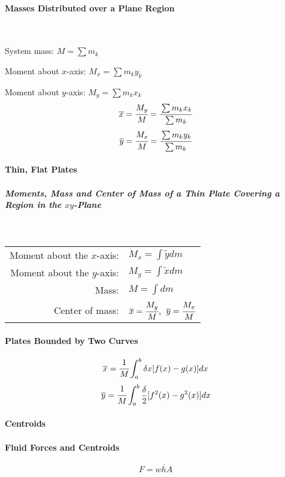\documentclass{article}
\begin{document}
            \paragraph{Masses Distributed over a Plane Region}
            \text{}\\
            \par System mass:   $M=\sum m_k$\\
            \par Moment about $x$-axis:     $M_x=\sum m_k y_k$\\
            \par Moment about $y$-axis:     $M_y=\sum m_k x_k$\\
            \[\overline{x}=\cfrac{M_y}{M}=\cfrac{\sum m_k x_k}{\sum m_k}\]
            \[\overline{y}=\cfrac{M_x}{M}=\cfrac{\sum m_k y_k}{\sum m_k}\]
            \paragraph{Thin, Flat Plates}
                \subparagraph{Moments, Mass and Center of Mass of a Thin Plate Covering a Region in the $xy$-Plane}
                \text{}\\ \par
                \begin{tabular}{|rl|}
                    \hline
                    Moment about the $x$-axis:&\quad $M_x=\int \widetilde{y} dm$\\
                    Moment about the $y$-axis:&\quad $M_y=\int \widetilde{x} dm$\\
                    Mass:&\quad $M=\int dm$\\
                    Center of mass:&\quad $\overline{x}=\cfrac{M_y}{M}$,\ $\overline{y}=\cfrac{M_x}{M}$\\
                    \hline
                \end{tabular}
            \paragraph{Plates Bounded by Two Curves}
                \[\overline{x}=\cfrac{1}{M}\int_a^b \delta x[f(x)-g(x)]dx\]
                \[\overline{y}=\cfrac{1}{M}\int_a^b \frac{\delta}{2}[f^2(x)-g^2(x)]dx\]
            \paragraph{Centroids}
            \paragraph{Fluid Forces and Centroids}
            \[F=w\overline{h}A\]
\end{document}
